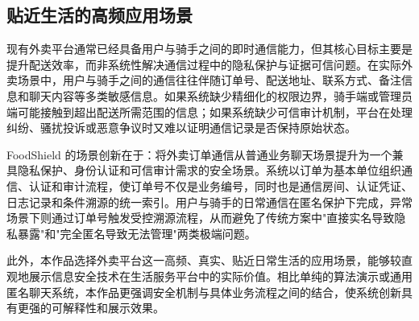 \subsection{贴近生活的高频应用场景}

现有外卖平台通常已经具备用户与骑手之间的即时通信能力，但其核心目标主要是提升配送效率，而非系统性解决通信过程中的隐私保护与证据可信问题。在实际外卖场景中，用户与骑手之间的通信往往伴随订单号、配送地址、联系方式、备注信息和聊天内容等多类敏感信息。如果系统缺少精细化的权限边界，骑手端或管理员端可能接触到超出配送所需范围的信息；如果系统缺少可信审计机制，平台在处理纠纷、骚扰投诉或恶意争议时又难以证明通信记录是否保持原始状态。

FoodShield 的场景创新在于：将外卖订单通信从普通业务聊天场景提升为一个兼具隐私保护、身份认证和可信审计需求的安全场景。系统以订单为基本单位组织通信、认证和审计流程，使订单号不仅是业务编号，同时也是通信房间、认证凭证、日志记录和条件溯源的统一索引。用户与骑手的日常通信在匿名保护下完成，异常场景下则通过订单号触发受控溯源流程，从而避免了传统方案中"直接实名导致隐私暴露"和"完全匿名导致无法管理"两类极端问题。

此外，本作品选择外卖平台这一高频、真实、贴近日常生活的应用场景，能够较直观地展示信息安全技术在生活服务平台中的实际价值。相比单纯的算法演示或通用匿名聊天系统，本作品更强调安全机制与具体业务流程之间的结合，使系统创新具有更强的可解释性和展示效果。

